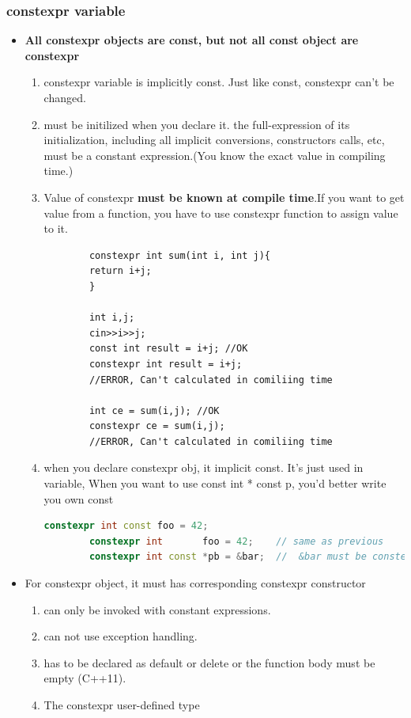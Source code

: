 \documentclass[a4paper,11pt,twoside]{book}
\begin{document}
\subsubsection{constexpr variable}
\begin{itemize}
	\item \textbf{All constexpr objects are const, but not all const object are constexpr}
	\begin{enumerate}
		\item constexpr variable is implicitly const. Just like const, constexpr can't be changed. 
		
		\item must be initilized when you declare it. the full-expression of its initialization, including all implicit conversions, constructors calls, etc, must be a constant expression.(You know the exact value in compiling time.)
		
		\item Value of constexpr \textbf{must be known at compile time}.If you want to get value from a function, you have to use constexpr function to assign value to it. 
		
		\begin{lstlisting}
		constexpr int sum(int i, int j){
		return i+j;
		}
		
		int i,j;
		cin>>i>>j;
		const int result = i+j; //OK
		constexpr int result = i+j; 
		//ERROR, Can't calculated in comiliing time
		
		int ce = sum(i,j); //OK
		constexpr ce = sum(i,j); 
		//ERROR, Can't calculated in comiliing time
		\end{lstlisting}
		
		\item when you declare constexpr obj, it implicit const. It's just used in variable, When you want to use const int * const p, you'd better write you own const 
		\begin{lstlisting}[frame=single, language=c++]
		constexpr int const foo = 42;
		constexpr int       foo = 42;    // same as previous
		constexpr int const *pb = &bar;  //  &bar must be constexpr
		\end{lstlisting}
	\end{enumerate}
	
	\item For constexpr object, it must has corresponding  constexpr constructor 
	\begin{enumerate}
		\item can only be invoked with constant expressions.
		\item can not use exception handling.
		\item has to be declared as default or delete or the function body must be empty (C++11).
		\item The constexpr user-defined type
	\end{enumerate}
	

\end{itemize}
\end{document}
